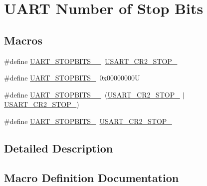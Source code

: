 \hypertarget{group___u_a_r_t___stop___bits}{}\section{U\+A\+RT Number of Stop Bits}
\label{group___u_a_r_t___stop___bits}
\subsection*{Macros}
\begin{DoxyCompactItemize}
\item 
\#define \mbox{\hyperlink{group___u_a_r_t___stop___bits_ga4c280770879367f7af395b7b41f60d93}{U\+A\+R\+T\+\_\+\+S\+T\+O\+P\+B\+I\+T\+S\+\_\+\_}}~\mbox{\hyperlink{group___peripheral___registers___bits___definition_gaee6ee01c6e5325b378b2209ef20d0a61}{U\+S\+A\+R\+T\+\_\+\+C\+R2\+\_\+\+S\+T\+O\+P\+\_}}
\item 
\#define \mbox{\hyperlink{group___u_a_r_t___stop___bits_ga7cf97e555292d574de8abc596ba0e2ce}{U\+A\+R\+T\+\_\+\+S\+T\+O\+P\+B\+I\+T\+S\+\_}}~0x00000000U
\item 
\#define \mbox{\hyperlink{group___u_a_r_t___stop___bits_ga99fcce2358d8ef0b60cf562e4d9fddd8}{U\+A\+R\+T\+\_\+\+S\+T\+O\+P\+B\+I\+T\+S\+\_\+\_}}~(\mbox{\hyperlink{group___peripheral___registers___bits___definition_gaee6ee01c6e5325b378b2209ef20d0a61}{U\+S\+A\+R\+T\+\_\+\+C\+R2\+\_\+\+S\+T\+O\+P\+\_}} $\vert$ \mbox{\hyperlink{group___peripheral___registers___bits___definition_ga2b24d14f0e5d1c76c878b08aad44d02b}{U\+S\+A\+R\+T\+\_\+\+C\+R2\+\_\+\+S\+T\+O\+P\+\_}})
\item 
\#define \mbox{\hyperlink{group___u_a_r_t___stop___bits_ga91616523380f7450aac6cb7e17f0c0f2}{U\+A\+R\+T\+\_\+\+S\+T\+O\+P\+B\+I\+T\+S\+\_}}~\mbox{\hyperlink{group___peripheral___registers___bits___definition_ga2b24d14f0e5d1c76c878b08aad44d02b}{U\+S\+A\+R\+T\+\_\+\+C\+R2\+\_\+\+S\+T\+O\+P\+\_}}
\end{DoxyCompactItemize}


\subsection{Detailed Description}


\subsection{Macro Definition Documentation}
\mbox{\label{group___u_a_r_t___stop___bits_ga4c280770879367f7af395b7b41f60d93}} 
